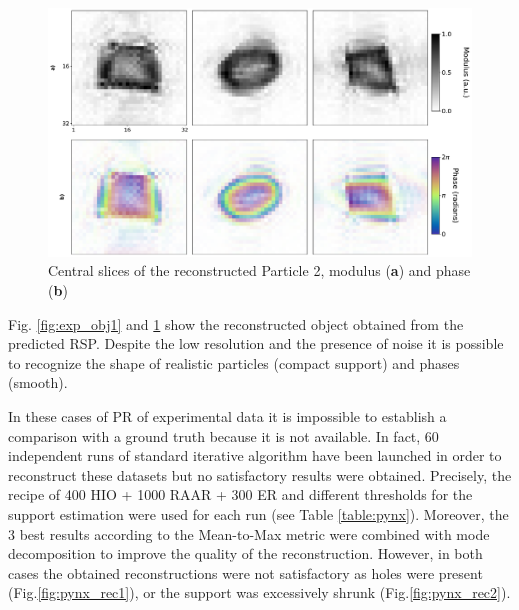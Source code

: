 \begin{figure}[H]
    \centering
    \includegraphics[width=\textwidth]{figures/Phasing/exp_data_rec2.pdf}
    \caption{Central slices of the reconstructed Particle 2, modulus (\textbf{a}) and phase  (\textbf{b})}
    \label{fig:exp_obj2}
\end{figure}

Fig. \ref{fig:exp_obj1} and \ref{fig:exp_obj2} show the reconstructed object obtained from the predicted RSP. Despite the 
low resolution and the presence of noise it is possible to recognize the shape of realistic particles (compact support) 
and phases (smooth).

In these cases of PR of experimental data it is impossible to establish a comparison with a ground truth because it 
is not available.
In fact, 60 independent runs of standard iterative algorithm have been launched in order to reconstruct these datasets but no satisfactory results 
were obtained. Precisely, the recipe of 400 HIO + 1000 RAAR + 300 ER and different thresholds for the support estimation
were used for each run (see Table \ref{table:pynx}). Moreover, the 3 best results according to the Mean-to-Max metric  \cite{Frisch2023CuAgCatalysts, Grimes2024CatalystStrain} 
were combined with mode decomposition \cite{favre-nicolin_free_2020} to improve the quality of the reconstruction. 
However, in both cases the obtained reconstructions were not satisfactory as holes were present (Fig.\ref{fig:pynx_rec1}), 
or the support was excessively shrunk (Fig.\ref{fig:pynx_rec2}).\\

